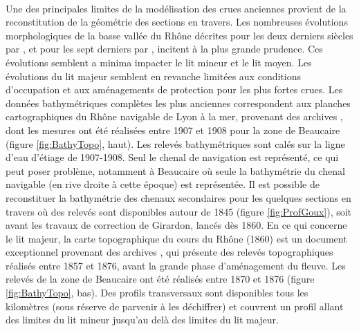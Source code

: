 \documentclass[11pt]{article}
\begin{document}
	\paragraph{} Une des principales limites de la modélisation des crues anciennes provient de la reconstitution de la géométrie des sections en travers. Les nombreuses évolutions morphologiques de la basse vallée du Rhône décrites pour les deux derniers siècles par \citet{raccasi_mutations_2008}, et pour les sept derniers	par \citet{pichard_sept_2014}, incitent à la plus grande prudence. Ces évolutions semblent a minima impacter le lit mineur et le lit moyen. Les évolutions du lit majeur semblent en revanche limitées aux conditions d'occupation et aux aménagements de protection pour les plus fortes crues. Les données bathymétriques complètes les plus anciennes correspondent aux planches cartographiques du Rhône navigable de Lyon à la mer, provenant des archives \citet{cnr_cartes_1908}, dont les mesures ont été réalisées entre 1907 et 1908 pour la zone de Beaucaire (figure \ref{fig:BathyTopo}, haut). Les relevés bathymétriques sont calés sur la ligne d'eau d'étiage de 1907-1908. Seul le chenal de navigation est représenté, ce qui peut poser problème, notamment à Beaucaire où seule la bathymétrie du chenal navigable (en rive droite à cette époque) est représentée. Il est possible de reconstituer la bathymétrie des chenaux secondaires pour les quelques sections en travers où des relevés sont disponibles autour de 1845 (figure \ref{fig:ProfGoux}), soit avant les travaux de correction de Girardon, lancés dès 1860. En ce qui concerne le lit majeur, la carte topographique du cours du Rhône (1860) est un document exceptionnel provenant des archives \citet{cnr_carte_1876}, qui présente des relevés topographiques réalisés entre 1857 et 1876, avant la grande phase d'aménagement du fleuve. Les relevés de la zone de Beaucaire ont été réalisés entre 1870 et 1876 (figure \ref{fig:BathyTopo}, bas). Des profils transversaux sont disponibles tous les kilomètres (sous réserve de parvenir à les déchiffrer) et couvrent un profil allant des limites du lit mineur jusqu'au delà des limites du lit majeur.
		
\end{document}

